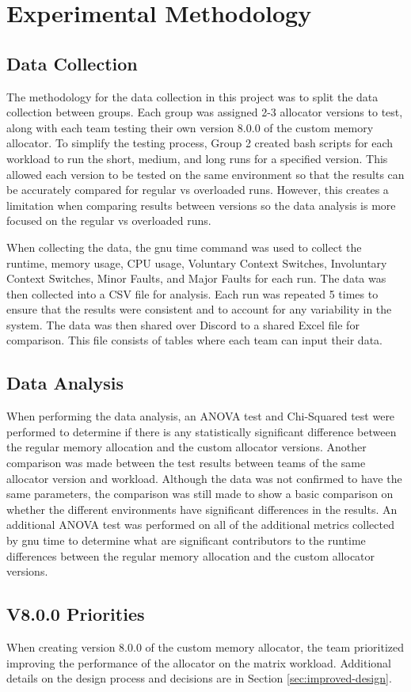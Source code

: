 \section{Experimental Methodology}
\label{sec:methodology}

\subsection{Data Collection}
The methodology for the data collection in this project was to split the data collection between groups. Each group was assigned 2-3 allocator versions to test, along with each team testing their own version 8.0.0 of the custom memory allocator.
To simplify the testing process, Group 2 created bash scripts for each workload to run the short, medium, and long runs for a specified version. This allowed each version to be tested on the same environment so that the results can be accurately compared for regular vs overloaded runs. 
However, this creates a limitation when comparing results between versions so the data analysis is more focused on the regular vs overloaded runs.

When collecting the data, the gnu time command was used to collect the runtime, memory usage, CPU usage, Voluntary Context Switches, Involuntary Context Switches, Minor Faults, and Major Faults for each run. The data was then collected into a CSV file for analysis. Each run was repeated 5 times to ensure that the results were consistent and to account for any variability in the system.
The data was then shared over Discord to a shared Excel file for comparison. This file consists of tables where each team can input their data.

\subsection{Data Analysis}
When performing the data analysis, an ANOVA test and Chi-Squared test were performed to determine if there is any statistically significant difference between the regular memory allocation and the custom allocator versions. 
Another comparison was made between the test results between teams of the same allocator version and workload. Although the data was not confirmed to have the same parameters, the comparison was still made to show a basic comparison on whether the different environments have significant differences in the results.
An additional ANOVA test was performed on all of the additional metrics collected by gnu time to determine what are significant contributors to the runtime differences between the regular memory allocation and the custom allocator versions.

\subsection{V8.0.0 Priorities}
When creating version 8.0.0 of the custom memory allocator, the team prioritized improving the performance of the allocator on the matrix workload. Additional details on the design process and decisions are in Section \ref{sec:improved-design}. 